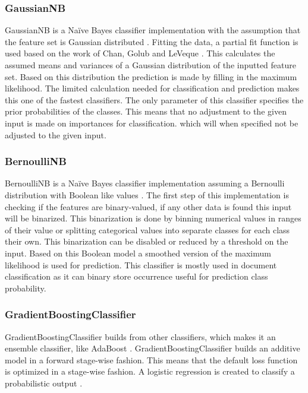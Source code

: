 \documentclass[a4paper,10pt]{article}
\begin{document}
\subsubsection{GaussianNB}
GaussianNB is a Naïve Bayes classifier implementation with the  assumption that the feature set is Gaussian distributed \cite{Bayes}. Fitting the data, a partial fit function is used based on the work of Chan, Golub and LeVeque \cite{Sam-var}. This calculates the assumed means and variances of a Gaussian distribution of the inputted feature set. Based on this distribution the prediction is made by filling in the maximum likelihood. The limited calculation needed for classification and prediction makes this one of the fastest classifiers. The only parameter of this classifier specifies the prior probabilities of the classes. This means that no adjustment to the given input is made on importances for classification. which will when specified not be adjusted to the given input. 

\subsubsection{BernoulliNB}
BernoulliNB is a Naïve Bayes classifier implementation assuming a Bernoulli distribution with Boolean like values \cite{NB-text}. The first step of this implementation is checking if the features are binary-valued, if any other data is found this input will be binarized. This binarization is done by binning numerical values in ranges of their value or splitting categorical values into separate classes for each class their own. This binarization can be disabled or reduced by a threshold on the input. Based on this Boolean model a smoothed version of the maximum likelihood is used for prediction. This classifier is mostly used in document classification as it can binary store occurrence useful for prediction class probability.

\subsubsection{GradientBoostingClassifier}
GradientBoostingClassifier builds from other classifiers, which makes it an ensemble classifier, like AdaBoost \cite{GradientBoost}. GradientBoostingClassifier builds an additive model in a forward stage-wise fashion. This means that the default loss function is optimized in a stage-wise fashion. A logistic regression is created to classify a probabilistic output \cite{Greedy-GBC}. 
\end{document}
